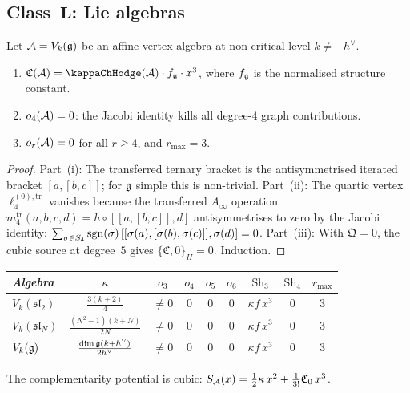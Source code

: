 
\subsection{Class~$\mathbf{L}$: Lie algebras}

\begin{theorem}
\ClaimStatusProvedHere
{}
Let $\mathcal{A} = V_k(\mathfrak{g})$ be an affine vertex algebra
at non-critical level $k \neq -h^\vee$.
\begin{enumerate}[label=\textup{(\roman*)}]
\item $\mathfrak{C}(\cA) = \kappaChHodge(\cA)\cdot f_\fg\cdot x^3$,
 where $f_{\mathfrak{g}}$ is the normalised structure constant.
\item $o_4(\mathcal{A}) = 0$: the Jacobi identity kills all
 degree-$4$ graph contributions.
\item $o_r(\mathcal{A}) = 0$ for all $r \geq 4$, and $r_{\max} = 3$.
\end{enumerate}
\end{theorem}

\begin{proof}
Part~(i): The transferred ternary bracket is the
antisymmetrised iterated bracket $[a,[b,c]]$; for $\mathfrak{g}$
simple this is non-trivial. Part~(ii): The quartic vertex
$\ell_4^{(0),\mathrm{tr}}$ vanishes because the transferred
$A_\infty$ operation $m_4^{\mathrm{tr}}(a,b,c,d) =
h \circ [[a,[b,c]],d]$ antisymmetrises to zero by the Jacobi
identity: $\sum_{\sigma \in S_4} \operatorname{sgn}(\sigma)\,
[[\sigma(a),[\sigma(b),\sigma(c)]],\sigma(d)] = 0$.
Part~(iii): With $\mathfrak{Q} = 0$, the cubic source at
degree~$5$ gives $\{\mathfrak{C}, 0\}_H = 0$. Induction.
\end{proof}

\begin{example}
\begin{center}
\small
\renewcommand{\arraystretch}{1.15}
\begin{tabular}{lcccccccc}
\toprule
\emph{Algebra} & $\kappa$ & $o_3$ & $o_4$ & $o_5$ &
 $o_6$ & $\mathrm{Sh}_3$ & $\mathrm{Sh}_4$ & $r_{\max}$ \\
\midrule
$V_k(\mathfrak{sl}_2)$ &
 $\frac{3(k+2)}{4}$ & $\neq 0$ & $0$ & $0$ & $0$ &
 $\kappa f\,x^3$ & $0$ & $3$ \\
$V_k(\mathfrak{sl}_N)$ &
 $\frac{(N^2{-}1)(k+N)}{2N}$ & $\neq 0$ & $0$ & $0$ & $0$ &
 $\kappa f\,x^3$ & $0$ & $3$ \\
$V_k(\mathfrak{g})$ &
 $\frac{\dim\mathfrak{g}(k+h^\vee)}{2h^\vee}$ & $\neq 0$ & $0$ & $0$ & $0$ &
 $\kappa f\,x^3$ & $0$ & $3$ \\
\bottomrule
\end{tabular}
\end{center}
The complementarity potential is cubic:
$S_{\mathcal{A}}(x) = \frac{1}{2}\kappa\,x^2 + \frac{1}{3!}
\mathfrak{C}_0\,x^3$.
\end{example}


